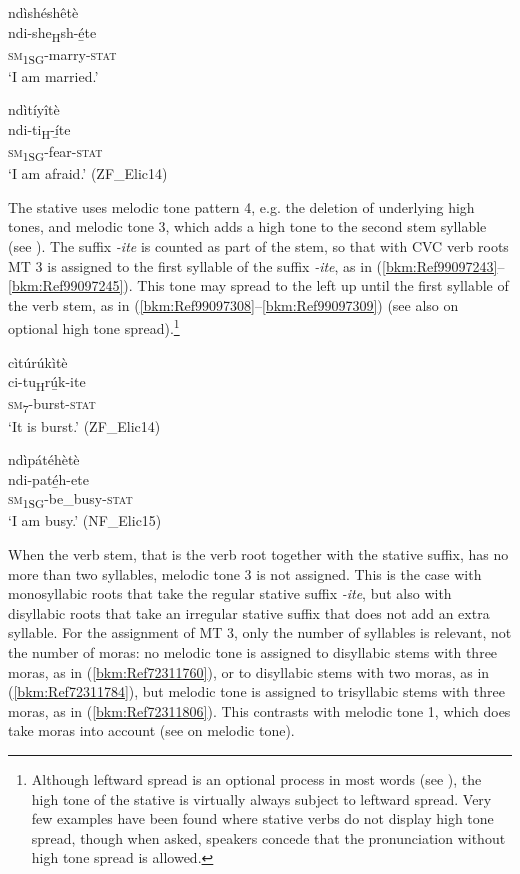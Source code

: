 \ea
\glll ndìshéshêtè\\
ndi-she\textsubscript{H}sh-é̲te\\
\textsc{sm}\textsubscript{1SG}-marry-\textsc{stat}\\
\glt ‘I am married.’
\z

\ea
\label{bkm:Ref99097245}
\glll ndìtíyîtè\\
ndi-ti\textsubscript{H}-í̲te\\
\textsc{sm}\textsubscript{1SG}-fear-\textsc{stat}\\
\glt ‘I am afraid.’ (ZF\_Elic14)
\z

The stative uses melodic tone pattern 4, e.g. the deletion of underlying high tones, and melodic tone 3, which adds a high tone to the second stem syllable (see ). The suffix \textit{-ite} is counted as part of the stem, so that with CVC verb roots MT 3 is assigned to the first syllable of the suffix \textit{-ite}, as in (\ref{bkm:Ref99097243}--\ref{bkm:Ref99097245}). This tone may spread to the left up until the first syllable of the verb stem, as in (\ref{bkm:Ref99097308}--\ref{bkm:Ref99097309}) (see also  on optional high tone spread).\footnote{Although leftward spread is an optional process in most words (see ), the high tone of the stative is virtually always subject to leftward spread. Very few examples have been found where stative verbs do not display high tone spread, though when asked, speakers concede that the pronunciation without high tone spread is allowed.}

\ea
\label{bkm:Ref99097308}
\glll cìtúrúkìtè\\
ci-tu\textsubscript{H}rú̲k-ite\\
\textsc{sm}\textsubscript{7}-burst-\textsc{stat}\\
\glt ‘It is burst.’ (ZF\_Elic14)
\z

\ea
\label{bkm:Ref99097309}
\glll ndìpátéhètè\\
ndi-paté̲h-ete\\
\textsc{sm}\textsubscript{1SG}-be\_busy-\textsc{stat}\\
\glt ‘I am busy.’ (NF\_Elic15)
\z

When the verb stem, that is the verb root together with the stative suffix, has no more than two syllables, melodic tone 3 is not assigned. This is the case with monosyllabic roots that take the regular stative suffix \textit{-ite}, but also with disyllabic roots that take an irregular stative suffix that does not add an extra syllable. For the assignment of MT 3, only the number of syllables is relevant, not the number of moras: no melodic tone is assigned to disyllabic stems with three moras, as in (\ref{bkm:Ref72311760}), or to disyllabic stems with two moras, as in (\ref{bkm:Ref72311784}), but melodic tone is assigned to trisyllabic stems with three moras, as in (\ref{bkm:Ref72311806}). This contrasts with melodic tone 1, which does take moras into account (see  on melodic tone).

